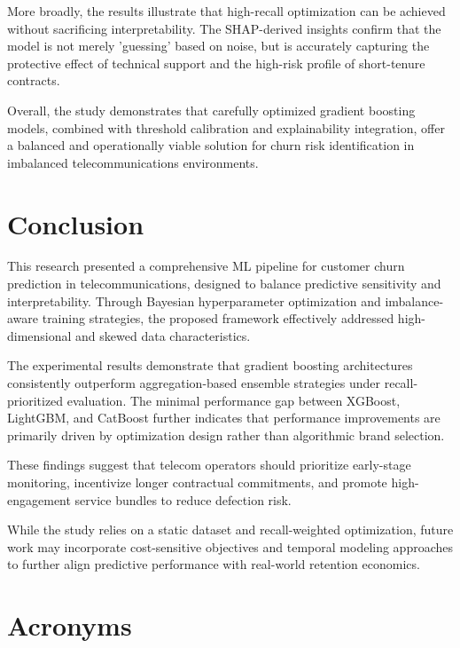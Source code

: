 \documentclass[a4paper,twoside]{article}
\begin{document}
More broadly, the results illustrate that high-recall optimization can be achieved without sacrificing interpretability. The SHAP-derived insights confirm that the model is not merely 'guessing' based on noise, but is accurately capturing the protective effect of technical support and the high-risk profile of short-tenure contracts.

Overall, the study demonstrates that carefully optimized gradient boosting models, combined with threshold calibration and explainability integration, offer a balanced and operationally viable solution for churn risk identification in imbalanced telecommunications environments.

\section{Conclusion}

This research presented a comprehensive ML pipeline for customer churn prediction in telecommunications, designed to balance predictive sensitivity and interpretability. Through Bayesian hyperparameter optimization and imbalance-aware training strategies, the proposed framework effectively addressed high-dimensional and skewed data characteristics.

The experimental results demonstrate that gradient boosting architectures consistently outperform aggregation-based ensemble strategies under recall-prioritized evaluation. The minimal performance gap between XGBoost, LightGBM, and CatBoost further indicates that performance improvements are primarily driven by optimization design rather than algorithmic brand selection.

These findings suggest that telecom operators should prioritize early-stage monitoring, incentivize longer contractual commitments, and promote high-engagement service bundles to reduce defection risk.

While the study relies on a static dataset and recall-weighted optimization, future work may incorporate cost-sensitive objectives and temporal modeling approaches to further align predictive performance with real-world retention economics.

\section*{Acronyms}
\end{document}
